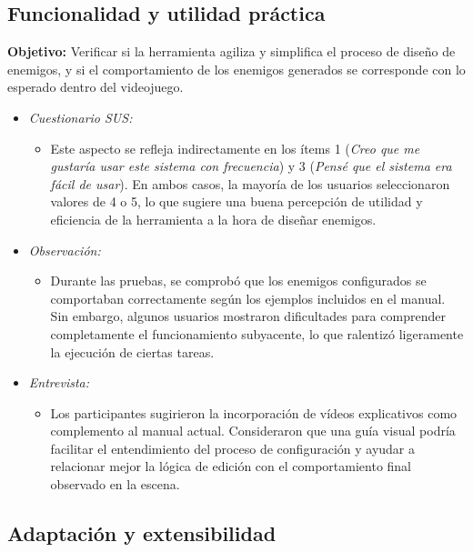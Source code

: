 \subsection{Funcionalidad y utilidad práctica}

\textbf{Objetivo:} Verificar si la herramienta agiliza y simplifica el proceso de diseño de enemigos, y si el comportamiento de los enemigos generados se corresponde con lo esperado dentro del videojuego.

\begin{itemize}
  \item \emph{Cuestionario SUS:}
    \begin{itemize}
      \item Este aspecto se refleja indirectamente en los ítems 1 (\textit{Creo que me gustaría usar este sistema con frecuencia}) y 3 (\textit{Pensé que el sistema era fácil de usar}). En ambos casos, la mayoría de los usuarios seleccionaron valores de 4 o 5, lo que sugiere una buena percepción de utilidad y eficiencia de la herramienta a la hora de diseñar enemigos.
    \end{itemize}
  
  \item \emph{Observación:}
    \begin{itemize}
      \item Durante las pruebas, se comprobó que los enemigos configurados se comportaban correctamente según los ejemplos incluidos en el manual. Sin embargo, algunos usuarios mostraron dificultades para comprender completamente el funcionamiento subyacente, lo que ralentizó ligeramente la ejecución de ciertas tareas.
    \end{itemize}
  
  \item \emph{Entrevista:}
    \begin{itemize}
      \item Los participantes sugirieron la incorporación de vídeos explicativos como complemento al manual actual. Consideraron que una guía visual podría facilitar el entendimiento del proceso de configuración y ayudar a relacionar mejor la lógica de edición con el comportamiento final observado en la escena.
    \end{itemize}
\end{itemize}

\subsection{Adaptación y extensibilidad}

